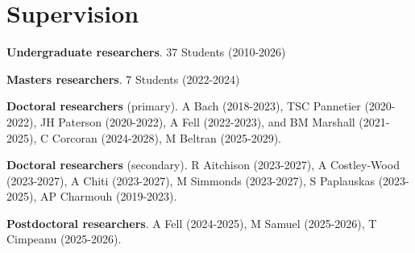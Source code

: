 \documentclass[letterpaper]{article}
\renewenvironment{itemize}{
  \begin{list}{}{
    \setlength{\leftmargin}{1.5em}
  }
}{
  \end{list}
}
\begin{document}
\section*{Supervision}
\begin{itemize}
\item {\bf Undergraduate researchers}. 37 Students (2010-2026) %
\item {\bf Masters researchers}. 7 Students (2022-2024)
\item {\bf Doctoral researchers} (primary). A Bach (2018-2023), TSC Pannetier (2020-2022), JH Paterson (2020-2022), A Fell (2022-2023), and BM Marshall (2021-2025), C Corcoran (2024-2028), M Beltran (2025-2029).
\item {\bf Doctoral researchers} (secondary). R Aitchison (2023-2027), A Costley-Wood (2023-2027), A Chiti (2023-2027), M Simmonds (2023-2027), S Paplauskas (2023-2025), AP Charmouh (2019-2023).
\item {\bf Postdoctoral researchers}. A Fell (2024-2025), M Samuel (2025-2026), T Cimpeanu (2025-2026).
\end{itemize}
\end{document}
